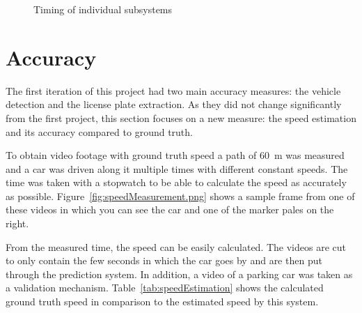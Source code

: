 \begin{figure}
    \centering
    \caption{Timing of individual subsystems}
    \label{fig:timing}
\end{figure}



\section{Accuracy}

The first iteration of this project had two main accuracy measures: the vehicle detection and the license plate extraction.
As they did not change significantly from the first project, this section focuses on a new measure: the speed estimation and its accuracy compared to ground truth.

To obtain video footage with ground truth speed a path of \SI{60}{\metre} was measured and a car was driven along it multiple times with different constant speeds.
The time was taken with a stopwatch to be able to calculate the speed as accurately as possible.
Figure~\ref{fig:speedMeasurement.png} shows a sample frame from one of these videos in which you can see the car and one of the marker pales on the right.


From the measured time, the speed can be easily calculated.
The videos are cut to only contain the few seconds in which the car goes by and are then put through the prediction system.
In addition, a video of a parking car was taken as a validation mechanism.
Table~\ref{tab:speedEstimation} shows the calculated ground truth speed in comparison to the estimated speed by this system.

